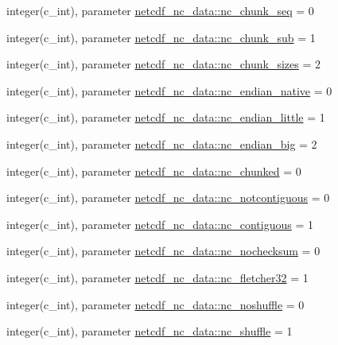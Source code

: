\begin{DoxyCompactItemize}
integer(c\+\_\+int), parameter \hyperlink{namespacenetcdf__nc__data_a670a88cd85c6946569dcdb77944759f2}{netcdf\+\_\+nc\+\_\+data\+::nc\+\_\+chunk\+\_\+seq} = 0
\item 
integer(c\+\_\+int), parameter \hyperlink{namespacenetcdf__nc__data_afce183a7c44aa40a43748ee186f35bc4}{netcdf\+\_\+nc\+\_\+data\+::nc\+\_\+chunk\+\_\+sub} = 1
\item 
integer(c\+\_\+int), parameter \hyperlink{namespacenetcdf__nc__data_ab2ad4eae132b6b45524488d5403a514f}{netcdf\+\_\+nc\+\_\+data\+::nc\+\_\+chunk\+\_\+sizes} = 2
\item 
integer(c\+\_\+int), parameter \hyperlink{namespacenetcdf__nc__data_ab48141d6b882e3aebb9186fc335a5aca}{netcdf\+\_\+nc\+\_\+data\+::nc\+\_\+endian\+\_\+native} = 0
\item 
integer(c\+\_\+int), parameter \hyperlink{namespacenetcdf__nc__data_ac19c8962a4354f48d66946d5b9ca1bb6}{netcdf\+\_\+nc\+\_\+data\+::nc\+\_\+endian\+\_\+little} = 1
\item 
integer(c\+\_\+int), parameter \hyperlink{namespacenetcdf__nc__data_ac0943c2fbde94f4eff05e12d0d45af5c}{netcdf\+\_\+nc\+\_\+data\+::nc\+\_\+endian\+\_\+big} = 2
\item 
integer(c\+\_\+int), parameter \hyperlink{namespacenetcdf__nc__data_a6dfffe49a4813a9de15e1c125b455fcc}{netcdf\+\_\+nc\+\_\+data\+::nc\+\_\+chunked} = 0
\item 
integer(c\+\_\+int), parameter \hyperlink{namespacenetcdf__nc__data_a15cb5ea532dce436d6e09a6763789895}{netcdf\+\_\+nc\+\_\+data\+::nc\+\_\+notcontiguous} = 0
\item 
integer(c\+\_\+int), parameter \hyperlink{namespacenetcdf__nc__data_a456ac0c8980e5952cdea6ecd7474b78f}{netcdf\+\_\+nc\+\_\+data\+::nc\+\_\+contiguous} = 1
\item 
integer(c\+\_\+int), parameter \hyperlink{namespacenetcdf__nc__data_afdaf9fe5a5476375552e52da08dd30f1}{netcdf\+\_\+nc\+\_\+data\+::nc\+\_\+nochecksum} = 0
\item 
integer(c\+\_\+int), parameter \hyperlink{namespacenetcdf__nc__data_a22e70218074a1eaa208303b3457d4029}{netcdf\+\_\+nc\+\_\+data\+::nc\+\_\+fletcher32} = 1
\item 
integer(c\+\_\+int), parameter \hyperlink{namespacenetcdf__nc__data_ace951380dd41179847dfd7a26a9cac39}{netcdf\+\_\+nc\+\_\+data\+::nc\+\_\+noshuffle} = 0
\item 
integer(c\+\_\+int), parameter \hyperlink{namespacenetcdf__nc__data_a1a38e88f099ae79186fedabf193684e6}{netcdf\+\_\+nc\+\_\+data\+::nc\+\_\+shuffle} = 1

\end{DoxyCompactItemize}
